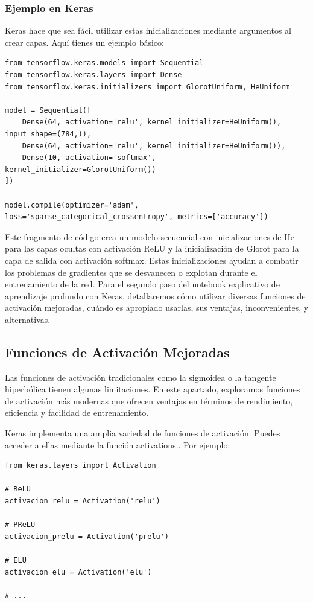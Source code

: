 \documentclass[11pt]{article}
\begin{document}
\subsubsection{Ejemplo en Keras}
\label{sec:org6805a11}
Keras hace que sea fácil utilizar estas inicializaciones mediante
argumentos al crear capas. Aquí tienes un ejemplo básico:

\begin{verbatim}
from tensorflow.keras.models import Sequential
from tensorflow.keras.layers import Dense
from tensorflow.keras.initializers import GlorotUniform, HeUniform

model = Sequential([
    Dense(64, activation='relu', kernel_initializer=HeUniform(), input_shape=(784,)),
    Dense(64, activation='relu', kernel_initializer=HeUniform()),
    Dense(10, activation='softmax', kernel_initializer=GlorotUniform())
])

model.compile(optimizer='adam', loss='sparse_categorical_crossentropy', metrics=['accuracy'])
\end{verbatim}

Este fragmento de código crea un modelo secuencial con inicializaciones
de He para las capas ocultas con activación ReLU y la inicialización de
Glorot para la capa de salida con activación softmax. Estas
inicializaciones ayudan a combatir los problemas de gradientes que se
desvanecen o explotan durante el entrenamiento de la red. Para el
segundo paso del notebook explicativo de aprendizaje profundo con Keras,
detallaremos cómo utilizar diversas funciones de activación mejoradas,
cuándo es apropiado usarlas, sus ventajas, inconvenientes, y
alternativas.

\subsection{Funciones de Activación Mejoradas}
\label{sec:orgd4a9e97}
Las funciones de activación tradicionales como la sigmoidea o la
tangente hiperbólica tienen algunas limitaciones. En este apartado,
exploramos funciones de activación más modernas que ofrecen ventajas en
términos de rendimiento, eficiencia y facilidad de entrenamiento.

Keras implementa una amplia variedad de funciones de activación. Puedes
acceder a ellas mediante la función activations.. Por ejemplo:

\begin{verbatim}
from keras.layers import Activation

# ReLU
activacion_relu = Activation('relu')

# PReLU
activacion_prelu = Activation('prelu')

# ELU
activacion_elu = Activation('elu')

# ...
\end{verbatim}
\end{document}
